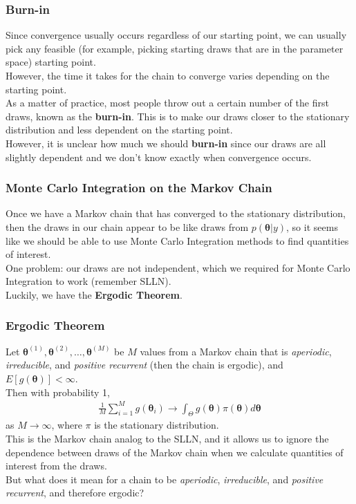 \documentclass[handout]{beamer}
\begin{document}
\begin{frame}
\frametitle{Burn-in}
\pause
Since convergence usually occurs regardless of our starting point, we
can usually pick any feasible (for example, picking starting draws
that are in the parameter space) starting point.\\
\bigskip
\pause 
However, the time it takes for the chain to converge varies depending
on the starting point.\\
\bigskip
\pause
As a matter of practice, most people throw out a certain number of the
first draws, known as the \textbf{burn-in}.  This is to make our draws
closer to the stationary distribution and less dependent on the
starting point.\\
\bigskip
\pause
However, it is unclear how much we should \textbf{burn-in} since our
draws are all slightly dependent and we don't know exactly when
convergence occurs.  
\end{frame}

\begin{frame}
\frametitle{Monte Carlo Integration on the Markov Chain}
\pause
Once we have a Markov chain that has converged to the stationary
distribution, then the draws in our chain appear to be like draws from
$p(\bm{\theta} | y)$, \pause so it seems like we should be able to use Monte
Carlo Integration methods to find quantities of interest.\\
\bigskip
\pause
One problem: our draws are not independent, which we required for
Monte Carlo Integration to work (remember SLLN).\\
\bigskip
\pause
Luckily, we have the \textbf{Ergodic Theorem}.
\end{frame}

\begin{frame}
\frametitle{Ergodic Theorem}
\pause
Let $\bm{\theta}^{(1)},\bm{\theta}^{(2)}, \dots, \bm{\theta}^{(M)}$ be
$M$ values from a Markov chain that is \textit{aperiodic},
\textit{irreducible}, and \textit{positive recurrent} (then the chain
is ergodic), and $E[g(\bm{\theta})] < \infty$.\\
\bigskip
\pause
Then with probability 1,
\begin{eqnarray*}
\frac{1}{M} \sum^{M}_{i=1} g(\bm{\theta}_i) \rightarrow \int_{\Theta}
g(\bm{\theta}) \pi(\bm{\theta}) d\bm{\theta}
\end{eqnarray*}
as $M \rightarrow \infty$, where $\pi$ is the stationary distribution.\\
\bigskip
\pause
This is the Markov chain analog to the SLLN, \pause and it allows us to
ignore the dependence between draws of the Markov chain when we
calculate quantities of interest from the draws.\\
\bigskip
\pause
But what does it mean for a chain to be \textit{aperiodic},
\textit{irreducible}, and \textit{positive recurrent}, and therefore ergodic? 
\end{frame}
\end{document}

